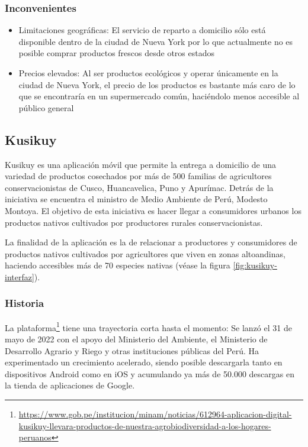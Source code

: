 
\subsubsection{Inconvenientes}

\begin{itemize}

	\item Limitaciones geográficas: El servicio de reparto a domicilio sólo está disponible dentro de la ciudad de Nueva York por lo que actualmente no es posible comprar productos frescos desde otros estados
	
	\item Precios elevados: Al ser productos ecológicos y operar únicamente en la ciudad de Nueva York, el precio de los productos es bastante más caro de lo que se encontraría en un supermercado común, haciéndolo menos accesible al público general

\end{itemize}

\subsection{Kusikuy}

Kusikuy es una aplicación móvil que permite la entrega a domicilio de una variedad de productos cosechados por más de 500 familias de agricultores conservacionistas de Cusco, Huancavelica, Puno y Apurímac. Detrás de la iniciativa se encuentra el ministro de Medio Ambiente de Perú, Modesto Montoya. El objetivo de esta iniciativa es hacer llegar a consumidores urbanos los productos nativos cultivados por productores rurales conservacionistas.

La finalidad de la aplicación es la de relacionar a productores y consumidores de productos nativos cultivados por agricultores que viven en zonas altoandinas, haciendo accesibles más de 70 especies nativas (véase la figura \ref{fig:kusikuy-interfaz}).


\subsubsection{Historia}

La plataforma\footnote{\url{https://www.gob.pe/institucion/minam/noticias/612964-aplicacion-digital-kusikuy-llevara-productos-de-nuestra-agrobiodiversidad-a-los-hogares-peruanos}} tiene una trayectoria corta hasta el momento: Se lanzó el 31 de mayo de 2022 con el apoyo del Ministerio del Ambiente, el Ministerio de Desarrollo Agrario y Riego y otras instituciones públicas del Perú. Ha experimentado un crecimiento acelerado, siendo posible descargarla tanto en dispositivos Android como en iOS y acumulando ya más de 50.000 descargas en la tienda de aplicaciones de Google.

